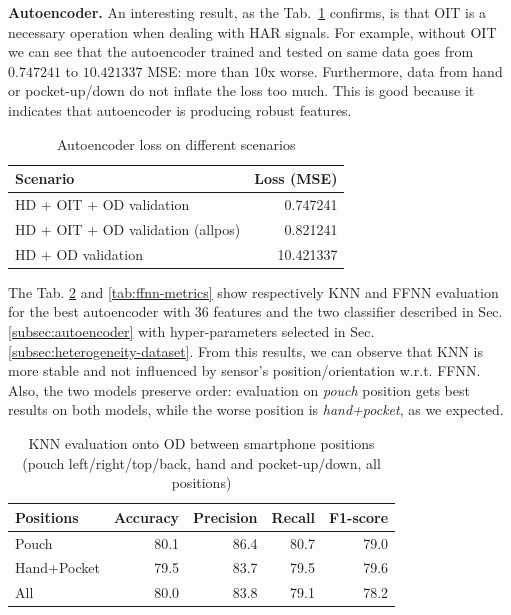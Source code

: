 \textbf{Autoencoder.}  An interesting result, as the
Tab.~\ref{tab:ae-loss} confirms, is that OIT is a necessary operation
when dealing with HAR signals. For example, without OIT we can see
that the autoencoder trained and tested on same data goes from
$0.747241$ to $10.421337$ MSE: more than $10$x worse. Furthermore,
data from hand or pocket-up/down do not inflate the loss too
much. This is good because it indicates that autoencoder is producing
robust features.

\begin{table}[h]
  \centering
  \begin{tabular}{lr}
    \hline
    Scenario & Loss (MSE) \\
    \hline
    HD + OIT + OD validation & 0.747241 \\
    HD + OIT + OD validation (allpos) & 0.821241 \\
    HD + OD validation & 10.421337 \\
    \hline
  \end{tabular}
  \caption{Autoencoder loss on different scenarios}
  \label{tab:ae-loss}
\end{table}

The Tab. \ref{tab:knn-metrics} and \ref{tab:ffnn-metrics} show
respectively KNN and FFNN evaluation for the best autoencoder with
$36$ features and the two classifier described in
Sec. \ref{subsec:autoencoder} with hyper-parameters selected in
Sec. \ref{subsec:heterogeneity-dataset}. From this results, we can
observe that KNN is more stable and not influenced by sensor's
position/orientation w.r.t. FFNN. Also, the two models preserve order:
evaluation on \textit{pouch} position gets best results on both
models, while the worse position is \textit{hand+pocket}, as we
expected.

\begin{table}[h]
  \centering
  \begin{tabular}{lrrrr}
    \hline
    Positions & Accuracy & Precision & Recall & F1-score \\
    \hline
    Pouch & 80.1 & 86.4 & 80.7 & 79.0 \\
    Hand+Pocket & 79.5 & 83.7 & 79.5 & 79.6 \\
    All & 80.0 & 83.8 & 79.1 & 78.2 \\
    \hline
  \end{tabular}
  \caption{KNN evaluation onto OD between smartphone positions (pouch
    left/right/top/back, hand and pocket-up/down, all positions)}
  \label{tab:knn-metrics}
\end{table}

